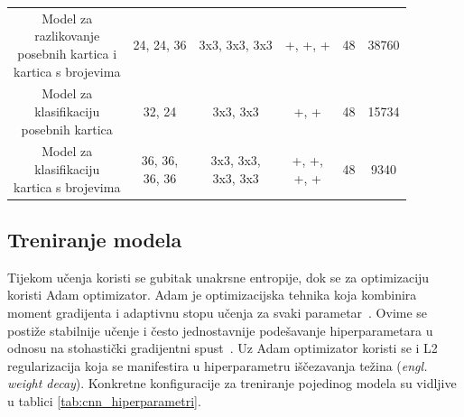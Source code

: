 \documentclass[diplomskirad]{fer}
\begin{document}
\begin{table}[htb]
\begin{adjustbox}{width=0.94\textwidth}
\begin{tabular}{cccccc}
						\makecell{Model za\\razlikovanje\\posebnih kartica i\\kartica s brojevima}
						& 24, 24, 36 & 3x3, 3x3, 3x3 & +, +, + & 48 & 38760 \\[9mm]
						
						\makecell{Model za\\klasifikaciju\\posebnih kartica}
						& 32, 24 & 3x3, 3x3 & +, + & 48 & 15734 \\[9mm]
						
						\makecell{Model za\\klasifikaciju\\kartica s brojevima}
						& \makecell{36, 36,\\36, 36} & \makecell{3x3, 3x3,\\3x3, 3x3} & \makecell{+, +,\\+, +} & 48 & 9340 \\
						
						\bottomrule
					\end{tabular}
				\end{adjustbox}
			\end{table}
		
		\subsection{Treniranje modela}
			Tijekom učenja koristi se gubitak unakrsne entropije, dok se za optimizaciju koristi Adam optimizator. Adam je optimizacijska tehnika koja kombinira moment gradijenta i adaptivnu stopu učenja za svaki parametar~\cite{GeeksForGeeksAdam}. Ovime se postiže stabilnije učenje i često jednostavnije podešavanje hiperparametara u odnosu na stohastički gradijentni spust~\cite{GeeksForGeeksAdam}. Uz Adam optimizator koristi se i L2 regularizacija koja se manifestira u hiperparametru iščezavanja težina (\textit{engl. weight decay}). Konkretne konfiguracije za treniranje pojedinog modela su vidljive u tablici \ref{tab:cnn_hiperparametri}.
			
\end{document}
